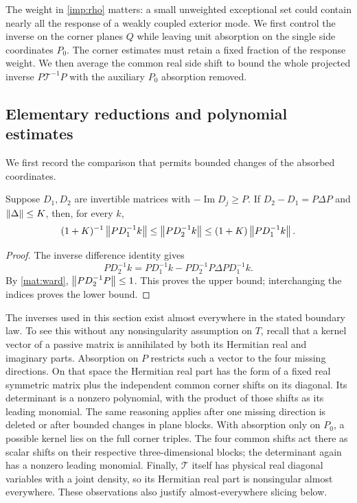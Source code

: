 The weight in \cref{imp:rho} matters: a small unweighted exceptional set
could contain nearly all the response of a weakly coupled exterior mode.
We first control the inverse on the corner planes $Q$ while leaving unit
absorption on the single side coordinates $P_0$. The corner estimates
must retain a fixed fraction of the response weight. We then average the
common real side shift to bound the whole projected inverse
$P\mathcal T^{-1}P$ with the auxiliary $P_0$ absorption removed.

\subsection{Elementary reductions and polynomial estimates}

We first record the comparison that permits bounded changes of the
absorbed coordinates.

\begin{lemma}
\label{imp:comparison}
Suppose $D_1,D_2$ are invertible matrices with
$-\operatorname{Im}D_j\ge P$. If
$D_2-D_1=P\Delta P$ and $\left\lVert\Delta\right\rVert\le K$, then, for every $k$,
\[
 (1+K)^{-1}\left\lVert PD_1^{-1}k\right\rVert
 \le \left\lVert PD_2^{-1}k\right\rVert
 \le (1+K)\left\lVert PD_1^{-1}k\right\rVert.
\]
\end{lemma}

\begin{proof}
The inverse difference identity gives
\[
 PD_2^{-1}k
 =PD_1^{-1}k-PD_2^{-1}P\Delta PD_1^{-1}k.
\]
By \cref{mat:ward}, $\left\lVert PD_2^{-1}P\right\rVert\le1$. This proves the upper
bound; interchanging the indices proves the lower bound.
\end{proof}

The inverses used in this section exist almost everywhere in the stated
boundary law. To see this without any nonsingularity assumption on $T$,
recall that a kernel vector of a passive matrix is annihilated by both its
Hermitian real and imaginary parts. Absorption on $P$ restricts such a
vector to the four missing directions. On that space the Hermitian real
part has the form of a fixed real symmetric matrix plus the independent
common corner shifts on its diagonal. Its determinant is a nonzero
polynomial, with the product of those shifts as its leading monomial.
The same reasoning applies after one missing direction is deleted or
after bounded changes in plane blocks. With absorption only on $P_0$,
a possible kernel lies on the full corner triples. The four common shifts
act there as scalar shifts on their respective three-dimensional blocks;
the determinant again has a nonzero leading monomial. Finally,
$\mathcal T$ itself has physical real diagonal variables with a joint
density, so its Hermitian real part is nonsingular
almost everywhere. These observations also justify almost-everywhere
slicing below.

